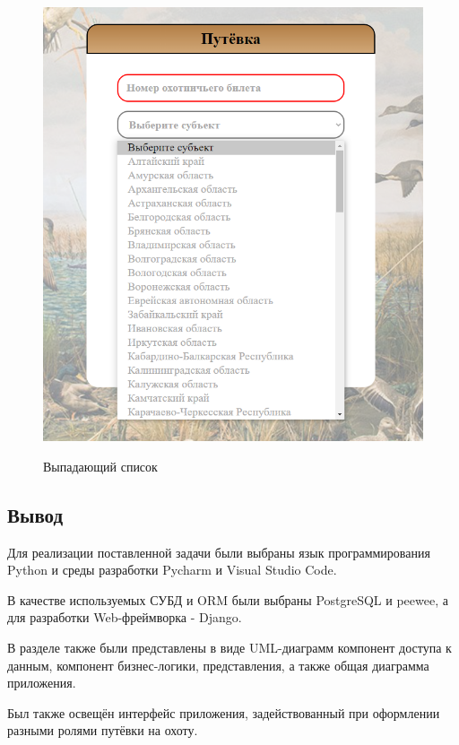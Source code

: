 	\begin{figure}[h!]
		\centering
		\begin{center}
			{\includegraphics[scale=0.5]{schemes/screens/scroll_menu.png}}
			\caption{Выпадающий список}
			\label{fig34:image}
		\end{center}
	\end{figure}
	
	\subsection*{Вывод}
	Для реализации поставленной задачи были выбраны язык программирования Python и среды разработки Pycharm и Visual Studio Code.
	
	В качестве используемых СУБД и ORM были выбраны PostgreSQL и peewee, а для разработки Web-фреймворка - Django.
	
	В разделе также были представлены в виде UML-диаграмм компонент доступа к данным, компонент бизнес-логики, представления, а также общая диаграмма приложения.
	
	Был также освещён интерфейс приложения, задействованный при оформлении разными ролями путёвки на охоту.
	
	
	
	
	










	
	
		
		 
		
	